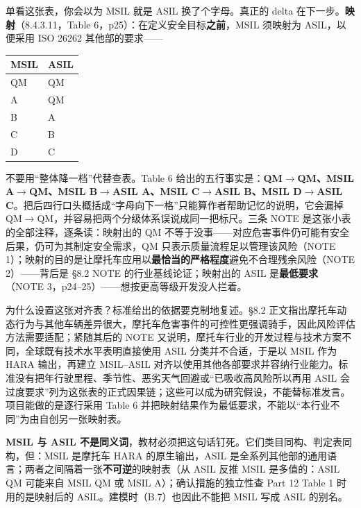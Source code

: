 单看这张表，你会以为 MSIL 就是 ASIL 换了个字母。真正的 delta 在下一步。\textbf{映射}（8.4.3.11，Table 6，p25）：在定义安全目标\textbf{之前}，MSIL 须映射为 ASIL，以便采用 ISO 26262 其他部的要求——

\begin{center}
\begingroup\small
\setlength{\tabcolsep}{4pt}
\begin{tabularx}{\linewidth}{@{}XX@{}}
\toprule
MSIL & ASIL \\
\midrule
QM & QM \\
A & QM \\
B & A \\
C & B \\
D & C \\
\bottomrule
\end{tabularx}
\endgroup
\end{center}

不要用“整体降一档”代替查表。Table 6 给出的五行事实是：\textbf{QM\(\rightarrow\)QM、MSIL A\(\rightarrow\)QM、MSIL B\(\rightarrow\)ASIL A、MSIL C\(\rightarrow\)ASIL B、MSIL D\(\rightarrow\)ASIL C}。把后四行口头概括成“字母向下一格”只能算作者帮助记忆的说明，它会漏掉 QM\(\rightarrow\)QM，并容易把两个分级体系误说成同一把标尺。三条 NOTE 是这张小表的全部注释，逐条读：映射出的 QM 不等于没事——对应危害事件仍可能有安全后果，仍可为其制定安全需求，QM 只表示质量流程足以管理该风险（NOTE 1）；映射的目的是让摩托车应用以\textbf{最恰当的严格程度}避免不合理残余风险（NOTE 2）——背后是 §8.2 NOTE 的行业基线论证；映射出的 ASIL 是\textbf{最低要求}（NOTE 3，p24–25）——想按更高等级开发没人拦着。

为什么设置这张对齐表？标准给出的依据要克制地复述。§8.2 正文指出摩托车动态行为与其他车辆差异很大，摩托车危害事件的可控性更强调骑手，因此风险评估方法需要适配；紧随其后的 NOTE 又说明，摩托车行业的开发过程与技术方案不同，全球既有技术水平表明直接使用 ASIL 分类并不合适，于是以 MSIL 作为 HARA 输出，再建立 MSIL–ASIL 对齐以使用其他各部要求并容纳行业能力。标准没有把年行驶里程、季节性、恶劣天气回避或“已吸收高风险所以再用 ASIL 会过度要求”列为这张表的正式因果链；这些可以成为研究假设，不能替标准发言。项目能做的是逐行采用 Table 6 并把映射结果作为最低要求，不能以“本行业不同”为由自创另一张映射表。

\textbf{MSIL 与 ASIL 不是同义词}，教材必须把这句话钉死。它们类目同构、判定表同构，但：MSIL 是摩托车 HARA 的原生输出，ASIL 是全系列其他部的通用语言；两者之间隔着一张\textbf{不可逆}的映射表（从 ASIL 反推 MSIL 是多值的：ASIL QM 可能来自 MSIL QM 或 MSIL A）；确认措施的独立性查 Part 12 Table 1 时用的是映射后的 ASIL。建模时（B.7）也因此不能把 MSIL 写成 ASIL 的别名。

